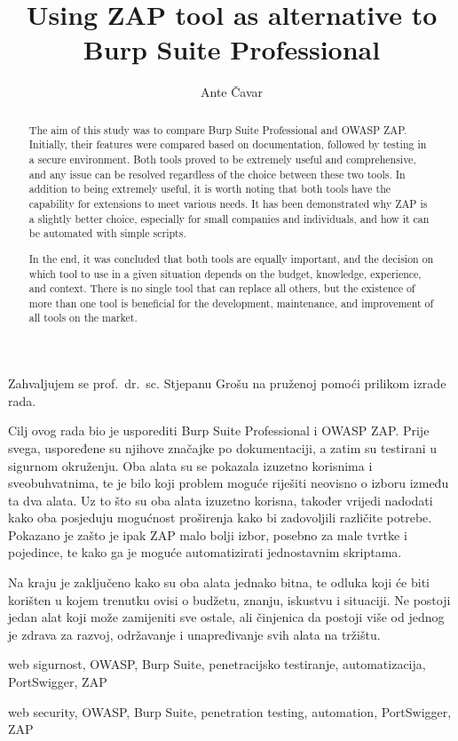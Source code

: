 \documentclass[utf8, seminar]{fer}
\title{Using ZAP tool as alternative to Burp Suite Professional}
\author{Ante Čavar}
\renewcommand\thepage{}
\begin{document}
\maketitle
{}
\begin{zahvale}
Zahvaljujem se prof.\ dr.\ sc. Stjepanu Grošu na pruženoj pomoći prilikom izrade rada.
\end{zahvale}
\newpage
\tableofcontents
\newpage
\mainmatter








\begin{sazetak}
  Cilj ovog rada bio je usporediti Burp Suite Professional i OWASP ZAP. Prije svega, uspoređene su njihove značajke po dokumentaciji, 
  a zatim su testirani u sigurnom okruženju. Oba alata su se pokazala izuzetno korisnima i sveobuhvatnima, te je bilo koji problem 
  moguće riješiti neovisno o izboru između ta dva alata. Uz to što su oba alata izuzetno korisna, također vrijedi nadodati kako oba 
  posjeduju mogućnost proširenja kako bi zadovoljili različite potrebe. Pokazano je zašto je ipak ZAP malo bolji izbor, posebno za 
  male tvrtke i pojedince, te kako ga je moguće automatizirati jednostavnim skriptama.

  Na kraju je zaključeno kako su oba alata jednako bitna, te odluka koji će biti korišten u kojem trenutku ovisi o budžetu, znanju, 
  iskustvu i situaciji. Ne postoji jedan alat koji može zamijeniti sve ostale, ali činjenica da postoji više od jednog je zdrava za 
  razvoj, održavanje i unapređivanje svih alata na tržištu.
\end{sazetak}
\begin{kljucnerijeci}
  web sigurnost, OWASP, Burp Suite, penetracijsko testiranje, automatizacija, PortSwigger, ZAP
\end{kljucnerijeci}
\begin{abstract}
  The aim of this study was to compare Burp Suite Professional and OWASP ZAP. Initially, their features were compared based on 
  documentation, followed by testing in a secure environment. Both tools proved to be extremely useful and comprehensive, and any 
  issue can be resolved regardless of the choice between these two tools. In addition to being extremely useful, it is worth noting 
  that both tools have the capability for extensions to meet various needs. It has been demonstrated why ZAP is a slightly better 
  choice, especially for small companies and individuals, and how it can be automated with simple scripts.

  In the end, it was concluded that both tools are equally important, and the decision on which tool to use in a given situation 
  depends on the budget, knowledge, experience, and context. There is no single tool that can replace all others, but the existence 
  of more than one tool is beneficial for the development, maintenance, and improvement of all tools on the market.
\end{abstract}
\begin{keywords}
  web security, OWASP, Burp Suite, penetration testing, automation, PortSwigger, ZAP
\end{keywords}
\end{document}
